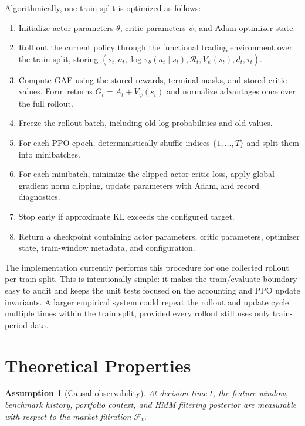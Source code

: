 \documentclass[11pt]{article}
\newtheorem{assumption}{Assumption}
\newcommand{\1}{\mathbf{1}}
\begin{document}
Algorithmically, one train split is optimized as follows:
\begin{enumerate}[leftmargin=*]
  \item Initialize actor parameters $\theta$, critic parameters $\psi$, and
  Adam optimizer state.
  \item Roll out the current policy through the functional trading environment
  over the train split, storing $(s_t,a_t,\log\pi_{\theta}(a_t\mid s_t),
  \mathcal{R}_t,V_\psi(s_t),d_t,\tau_t)$.
  \item Compute GAE using the stored rewards, terminal masks, and stored critic
  values. Form returns $G_t=A_t+V_\psi(s_t)$ and normalize advantages once
  over the full rollout.
  \item Freeze the rollout batch, including old log probabilities and old
  values.
  \item For each PPO epoch, deterministically shuffle indices
  $\{1,\ldots,T\}$ and split them into minibatches.
  \item For each minibatch, minimize the clipped actor-critic loss, apply
  global gradient norm clipping, update parameters with Adam, and record
  diagnostics.
  \item Stop early if approximate KL exceeds the configured target.
  \item Return a checkpoint containing actor parameters, critic parameters,
  optimizer state, train-window metadata, and configuration.
\end{enumerate}

The implementation currently performs this procedure for one collected rollout
per train split. This is intentionally simple: it makes the train/evaluate
boundary easy to audit and keeps the unit tests focused on the accounting and
PPO update invariants. A larger empirical system could repeat the rollout and
update cycle multiple times within the train split, provided every rollout
still uses only train-period data.

\section{Theoretical Properties}

\begin{assumption}[Causal observability]
At decision time $t$, the feature window, benchmark history, portfolio context,
and HMM filtering posterior are measurable with respect to the market filtration
$\mathcal{F}_t$.
\end{assumption}
\end{document}
